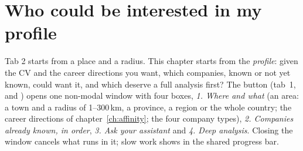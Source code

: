 \chapter{Who could be interested in my profile}\label{ch:interest}

Tab 2 starts from a place and a radius. This chapter starts from the \emph{profile}: given the CV
and the career directions you want, which companies, known or not yet known, could want it, and
which deserve a full analysis first? The button  (tab~1,
and ) opens one non-modal window with four
boxes, \emph{1. Where and what} (an area: a town and a radius of 1--300\,km, a province, a region or
the whole country; the career directions of chapter~\ref{ch:affinity}; the four company types),
\emph{2. Companies already known, in order}, \emph{3. Ask your assistant} and \emph{4. Deep analysis}.
Closing the window cancels what runs in it; slow work shows in the shared progress bar.

